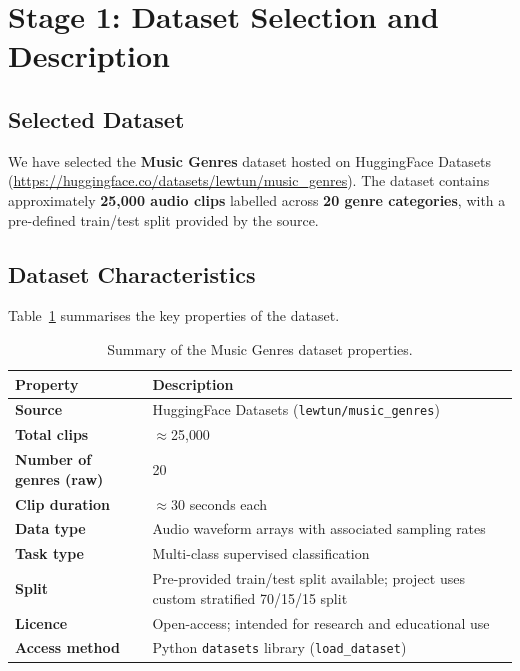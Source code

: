 \documentclass[12pt, a4paper]{article}
\begin{document}
\section{Stage 1: Dataset Selection and Description}
\label{sec:dataset}

\subsection{Selected Dataset}

We have selected the \textbf{Music Genres} dataset hosted on HuggingFace Datasets
(\url{https://huggingface.co/datasets/lewtun/music\_genres}). The dataset contains
approximately \textbf{25{,}000 audio clips} labelled across \textbf{20 genre categories},
with a pre-defined train/test split provided by the source.

\subsection{Dataset Characteristics}

Table~\ref{tab:dataset_summary} summarises the key properties of the dataset.

\begin{table}[h!]
    \centering
    \caption{Summary of the Music Genres dataset properties.}
    \label{tab:dataset_summary}
    \begin{tabular}{>{\bfseries}p{4.5cm} p{8.5cm}}
        \toprule
        Property & Description \\
        \midrule
        Source & HuggingFace Datasets (\texttt{lewtun/music\_genres}) \\
        Total clips & $\approx$25{,}000 \\
        Number of genres (raw) & 20 \\
        Clip duration & $\approx$30 seconds each \\
        Data type & Audio waveform arrays with associated sampling rates \\
        Task type & Multi-class supervised classification \\
        Split & Pre-provided train/test split available; project uses custom stratified 70/15/15 split \\
        Licence & Open-access; intended for research and educational use \\
        Access method & Python \texttt{datasets} library (\texttt{load\_dataset}) \\
        \bottomrule
    \end{tabular}
\end{table}
\end{document}
